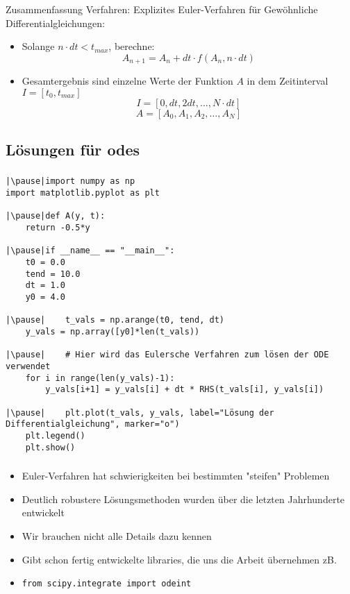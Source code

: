 \begin{frame}
    \frametitle{\insertsubsection}
    Zusammenfassung Verfahren: Explizites Euler-Verfahren für Gewöhnliche Differentialgleichungen:
    \begin{itemize}
        \item Solange $n\cdot dt < t_{max}$, berechne:
        \[A_{n+1} = A_n + dt\cdot f(A_n, n\cdot dt)\]
        \item Gesamtergebnis sind einzelne Werte der Funktion $A$ in dem Zeitinterval $I=[t_0, t_{max}]$
        \[I = [0, dt, 2dt, \dots, N\cdot dt]\]
        \[A = [A_0, A_1, A_2, \dots, A_N]\]
    \end{itemize}
\end{frame}


\subsection{Lösungen für \acsp{ode}}
\label{subsec:solving}
\begin{frame}[fragile]
    \frametitle{\insertsubsection}
    \begin{verbatim}
|\pause|import numpy as np
import matplotlib.pyplot as plt

|\pause|def A(y, t):
    return -0.5*y

|\pause|if __name__ == "__main__":
    t0 = 0.0
    tend = 10.0
    dt = 1.0
    y0 = 4.0

|\pause|    t_vals = np.arange(t0, tend, dt)
    y_vals = np.array([y0]*len(t_vals))

|\pause|    # Hier wird das Eulersche Verfahren zum lösen der ODE verwendet
    for i in range(len(y_vals)-1):
        y_vals[i+1] = y_vals[i] + dt * RHS(t_vals[i], y_vals[i])

|\pause|    plt.plot(t_vals, y_vals, label="Lösung der Differentialgleichung", marker="o")
    plt.legend()
    plt.show()
	\end{verbatim}
\end{frame}


\begin{frame}[fragile]
    \frametitle{\insertsubsection}
    \begin{itemize}
        \item Euler-Verfahren hat schwierigkeiten bei bestimmten "steifen" Problemen
        \item Deutlich robustere Lösungsmethoden wurden über die letzten Jahrhunderte entwickelt
        \item Wir brauchen nicht alle Details dazu kennen
        \item Gibt schon fertig entwickelte libraries, die uns die Arbeit übernehmen zB.
        \item[] \begin{verbatim}
from scipy.integrate import odeint
                \end{verbatim}
    \end{itemize}
\end{frame}


